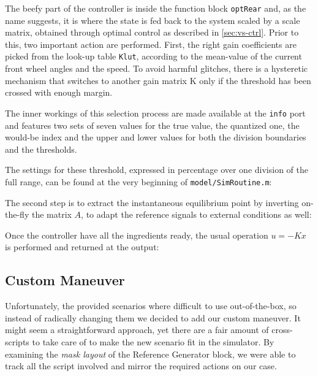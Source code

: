 		The beefy part of the controller is inside the function block \lstinline{optRear} and, as the name suggests, it is where the state is fed back to the system scaled by a scale
		matrix, obtained through optimal control as described in \vref{sec:vs-ctrl}. Prior to this, two important action are performed.
		First, the right gain coefficients are picked from the look-up table \lstinline{Klut}, according to the mean-value of the current front wheel angles and the speed.
		To avoid harmful glitches, there is a hysteretic mechanism that switches to another gain matrix K only if the threshold has been crossed with enough margin.
		
		The inner workings of this selection process are made available at the \lstinline{info} port and features two sets of seven values for the true value, the quantized one,
		the would-be index and the upper and lower values for both the division boundaries and the thresholds.
		

		The settings for these threshold, expressed in percentage over one division of the full range, can be found at the very beginning of \texttt{model/SimRoutine.m}:
		

		The second step is to extract the instantaneous equilibrium point by inverting on-the-fly the matrix $A$, to adapt the reference signals to external conditions as well:
		

		Once the controller have all the ingredients ready, the usual operation $u = -Kx$ is performed and returned at the output:
		


		\subsection{Custom Maneuver}
		\label{ssec:vs-int-cm}

		Unfortunately, the provided scenarios where difficult to use out-of-the-box, so instead of radically changing them we decided to add our custom maneuver.
		It might seem a straightforward approach, yet there are a fair amount of cross-scripts to take care of to make the new scenario fit in the simulator.
		By examining the \emph{mask layout} of the Reference Generator block, we were able to track all the script involved and mirror the required actions on our case.

